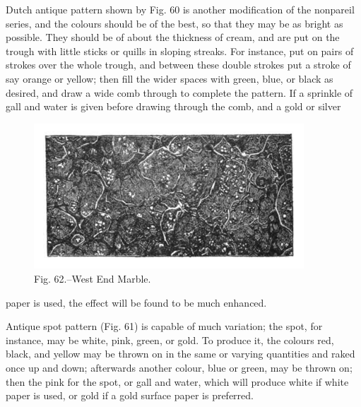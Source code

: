 \documentclass[twoside]{book}
\begin{document}
Dutch antique pattern shown by Fig. 60 is another
modification of the nonpareil series, and
the colours should be of the best, so that they
\pagebreak
may be as bright as possible. They should be of
about the thickness of cream, and are put on the
trough with little sticks or quills in sloping streaks.
For instance, put on pairs of strokes over the whole
trough, and between these double strokes put a
stroke of say orange or yellow; then fill the wider
spaces with green, blue, or black as desired, and
draw a wide comb through to complete the pattern.
If a sprinkle of gall and water is given before
drawing through the comb, and a gold or silver
	\begin{figure}[h]
		\centering
		\includegraphics[width=0.9\textwidth]{Figures/_062.png}
		\caption*{Fig. 62.--West End Marble.}
	\end{figure}
paper is used, the effect will be found to be much
enhanced.

Antique spot pattern (Fig. 61) is capable of much
variation; the spot, for instance, may be white,
pink, green, or gold. To produce it, the colours
red, black, and yellow may be thrown on in the
same or varying quantities and raked once up and
down; afterwards another colour, blue or green,
may be thrown on; then the pink for the spot, or
gall and water, which will produce white if white
paper is used, or gold if a gold surface paper is
preferred.
\end{document}
